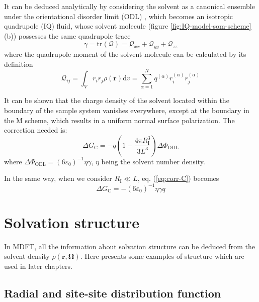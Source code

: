 It can be deduced analytically by considering the solvent as a canonical
ensemble under the orientational disorder limit (ODL) \citep{Kastenholz_2006_I},
which becomes an isotropic quadrupole (IQ) fluid, whose solvent molecule
(figure \ref{fig:IQ-model-som-scheme} (b)) possesses the same quadrupole
trace 
\begin{equation}
\gamma=\mathrm{tr}(\mathbf{\mathcal{Q}})=\mathcal{Q}_{xx}+\mathcal{Q}_{yy}+\mathcal{Q}_{zz}
\end{equation}
where the quadrupole moment of the solvent molecule can be calculated
by its definition \citep{Multipole}
\begin{equation}
\mathcal{Q}_{ij}=\int_{V}r_{i}r_{j}\rho(\mathbf{r})\mathrm{d}v=\sum_{\alpha=1}^{N}q^{(\alpha)}r_{i}^{(\alpha)}r_{j}^{(\alpha)}
\end{equation}

It can be shown that the charge density of the solvent located within
the boundary of the sample system vanishes everywhere, except at the
boundary in the M scheme, which results in a uniform normal surface
polarization. The correction needed is:
\begin{equation}
\Delta G_{\mathrm{C}}=-q\left(1-\frac{4\pi R_{\mathrm{I}}^{3}}{3L^{3}}\right)\Delta\Phi_{\mathrm{ODL}}\label{eq:corr-C}
\end{equation}
where $\Delta\Phi_{\mathrm{ODL}}=\left(6\varepsilon_{0}\right)^{-1}\eta\gamma$,
$\eta$ being the solvent number density.

In the same way, when we consider $R_{\mathrm{I}}\ll L$, eq. (\ref{eq:corr-C})
becomes
\begin{equation}
\Delta G_{\mathrm{C}}=-\left(6\varepsilon_{0}\right)^{-1}\eta\gamma q
\end{equation}


\section{Solvation structure\label{sec:Solvation-structure}}

In MDFT, all the information about solvation structure can be deduced
from the solvent density $\rho(\mathbf{r},\mathbf{\Omega})$. Here
presents some examples of structure which are used in later chapters.

\subsection{Radial and site-site distribution function}

